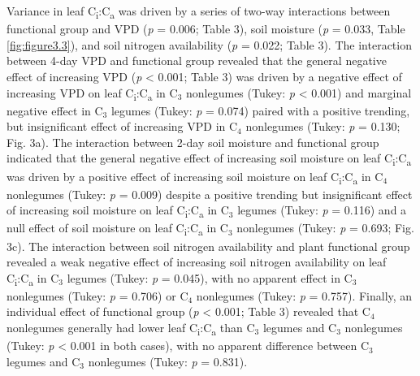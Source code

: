 Variance in leaf C\textsubscript{i}:C\textsubscript{a} was driven by a series of two-way interactions between functional group and VPD (\textit{p} = 0.006; Table 3), soil moisture (\textit{p} = 0.033, Table \ref{fig:figure3.3}), and soil nitrogen availability (\textit{p} = 0.022; Table 3). The interaction between 4-day VPD and functional group revealed that the general negative effect of increasing VPD (\textit{p} < 0.001; Table 3) was driven by a negative effect of increasing VPD on leaf C\textsubscript{i}:C\textsubscript{a} in C$_3$ nonlegumes (Tukey: \textit{p} < 0.001) and marginal negative effect in C$_3$ legumes (Tukey: \textit{p} = 0.074) paired with a positive trending, but insignificant effect of increasing VPD in C$_4$ nonlegumes (Tukey: \textit{p} = 0.130; Fig. 3a). The interaction between 2-day soil moisture and functional group indicated that the general negative effect of increasing soil moisture on leaf C\textsubscript{i}:C\textsubscript{a} was driven by a positive effect of increasing soil moisture on leaf C\textsubscript{i}:C\textsubscript{a} in C$_4$ nonlegumes (Tukey: \textit{p} = 0.009) despite a positive trending but insignificant effect of increasing soil moisture on leaf C\textsubscript{i}:C\textsubscript{a} in C$_3$ legumes (Tukey: \textit{p} = 0.116) and a null effect of soil moisture on leaf C\textsubscript{i}:C\textsubscript{a} in C$_3$ nonlegumes (Tukey: \textit{p} = 0.693; Fig. 3c). The interaction between soil nitrogen availability and plant functional group revealed a weak negative effect of increasing soil nitrogen availability on leaf C\textsubscript{i}:C\textsubscript{a} in C$_3$ legumes (Tukey: \textit{p} = 0.045), with no apparent effect in C$_3$ nonlegumes (Tukey: \textit{p} = 0.706) or C$_4$ nonlegumes (Tukey: \textit{p} = 0.757). Finally, an individual effect of functional group (\textit{p} < 0.001; Table 3) revealed that C$_4$ nonlegumes generally had lower leaf C\textsubscript{i}:C\textsubscript{a} than C$_3$ legumes and C$_3$ nonlegumes (Tukey: \textit{p} < 0.001 in both cases), with no apparent difference between C$_3$ legumes and C$_3$ nonlegumes (Tukey: \textit{p} = 0.831).

